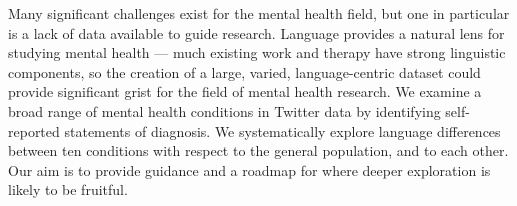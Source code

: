 Many significant challenges exist for the mental health field, but one in particular is a lack of data available to guide research. Language provides a natural lens for studying mental health --- much existing work and therapy have strong linguistic components, so the creation of a large, varied, language-centric dataset could provide significant grist for the field of mental health research. We examine a broad range of mental health conditions in Twitter data by identifying self-reported statements of diagnosis. We systematically explore language differences between ten conditions with respect to the general population, and to each other. Our aim is to provide guidance and a roadmap for where deeper exploration is likely to be fruitful.
